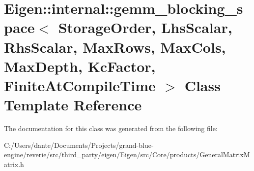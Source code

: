 \hypertarget{class_eigen_1_1internal_1_1gemm__blocking__space}{}\section{Eigen\+::internal\+::gemm\+\_\+blocking\+\_\+space$<$ Storage\+Order, Lhs\+Scalar, Rhs\+Scalar, Max\+Rows, Max\+Cols, Max\+Depth, Kc\+Factor, Finite\+At\+Compile\+Time $>$ Class Template Reference}
\label{class_eigen_1_1internal_1_1gemm__blocking__space}


The documentation for this class was generated from the following file\+:\begin{DoxyCompactItemize}
\item 
C\+:/\+Users/dante/\+Documents/\+Projects/grand-\/blue-\/engine/reverie/src/third\+\_\+party/eigen/\+Eigen/src/\+Core/products/General\+Matrix\+Matrix.\+h\end{DoxyCompactItemize}
